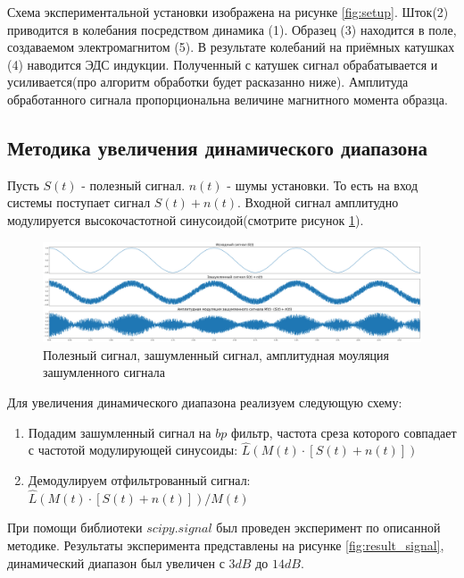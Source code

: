 \documentclass[a4paper, 12pt]{extarticle}
\begin{document}
Схема экспериментальной установки изображена на рисунке \ref{fig:setup}.
Шток(2) приводится в колебания посредством динамика (1). Образец (3) находится в поле, создаваемом электромагнитом (5). В результате колебаний на приёмных катушках (4) наводится ЭДС индукции. Полученный с катушек сигнал обрабатывается и усиливается(про алгоритм обработки будет расказанно ниже). Амплитуда обработанного сигнала пропорциональна величине магнитного момента образца.

\subsection*{\textcolor{sub_header}{Методика увеличения динамического диапазона}}




Пусть $S(t)$ - полезный сигнал. $n(t)$ - шумы установки. То есть на вход системы поступает сигнал $S(t) + n(t)$. Входной сигнал амплитудно модулируется высокочастотной синусоидой(смотрите рисунок \ref{fig:input_signals}).

\begin{figure}[htbp]
    \centering
    \includegraphics[width = 1 \textwidth]{input_signals.png}
    \caption{Полезный сигнал, зашумленный сигнал, амплитудная моуляция зашумленного сигнала}
    \label{fig:input_signals}
\end{figure}

Для увеличения динамического диапазона реализуем следующую схему:
\begin{enumerate}
    \item Подадим зашумленный сигнал на $bp$ фильтр, частота среза которого совпадает с частотой модулирующей синусоиды: $\hat{L}(M(t) \cdot [S(t) + n(t)])$
    \item Демодулируем отфильтрованный сигнал:  $\hat{L}(M(t) \cdot [S(t) + n(t)]) / M(t)$
\end{enumerate}

При помощи библиотеки $scipy.signal$ был проведен эксперимент по описанной методике. Результаты эксперимента представлены на рисунке \ref{fig:result_signal}, динамический диапазон был увеличен с $3 dB$ до $14 dB$.
\end{document}
